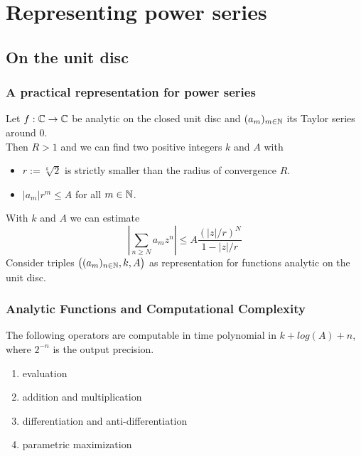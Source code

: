 
\section{Representing power series}
\subsection{On the unit disc}
\begin{frame}
\frametitle{A practical representation for power series}
\begin{lemma}
Let $f : \mathbb{C} \to \mathbb{C}$ be analytic on the closed unit disc and $(a_m)_{m\in\mathbb{N}}$ its Taylor series around $0$.\\
Then $R>1$ \pause and we can find two positive integers $k$ and $A$ with 
\begin{itemize}
\item $r := \sqrt[k]{2}$ is strictly smaller than the radius of convergence $R$.
\item $|a_m|r^m \leq A$ for all $m \in \mathbb{N}$.
\end{itemize}
\end{lemma}
\pause
With $k$ and $A$ we can estimate 
$$ \left | \sum_{n \geq N} a_m z^n \right | \leq A\frac{(|z|/r)^N}{1-|z|/r} $$\pause
Consider triples $\big((a_m)_{n \in \mathbb{N}}, k, A\big)$ as representation for functions analytic on the unit disc.
\end{frame}
\begin{frame}[<+->]
\frametitle{Analytic Functions and Computational Complexity}
\begin{theorem}
  The following operators are computable in time polynomial in $k+log(A)+n$, where $2^{-n}$ is the output precision.
\begin{enumerate}
\item evaluation
\item addition and multiplication
\item differentiation and anti-differentiation
\item parametric maximization
\end{enumerate}
\end{theorem}
\end{frame}
